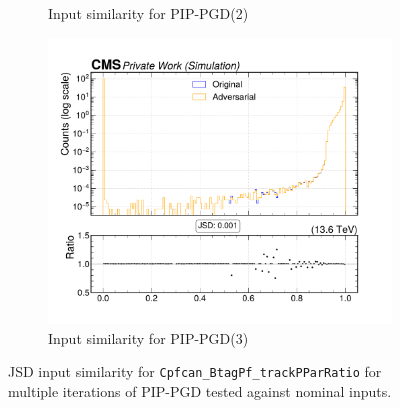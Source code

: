 \begin{figure}[htbp]
\begin{subfigure}[t]{0.32\textwidth}
    \caption*{Input similarity for PIP-PGD(2)}
  \end{subfigure}\hfill
  \begin{subfigure}[t]{0.32\textwidth}
    \includegraphics[width=\linewidth]{media/output/features/compare/combined_it_3/cmp_cpf_arr_Cpfcan_BtagPf_trackPParRatio.pdf}
    \caption*{Input similarity for PIP-PGD(3)}
  \end{subfigure}

  \caption*{JSD input similarity for \texttt{Cpfcan\_BtagPf\_trackPParRatio} for multiple iterations of PIP-PGD tested against nominal inputs.}
  \label{fig:combined_input_Cpfcan_BtagPf_trackPParRatio}
\end{figure}

